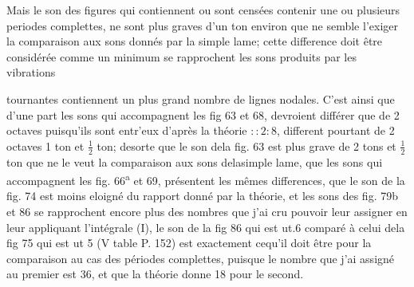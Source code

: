 \documentclass[11pt,a4paper]{article}
\begin{document}
Mais  le son des figures qui contiennent ou
sont censées contenir une ou plusieurs periodes complettes,
ne sont  plus graves d'un ton environ que ne semble l'exiger
la comparaison aux sons donnés par la simple lame;
 cette difference doit  être considérée comme un minimum
  se rapprochent  les sons produits par les vibrations


tournantes   contiennent
un plus grand nombre de lignes nodales. C'est ainsi que d'une part
les sons qui accompagnent les fig 63 et 68,   devroient
différer que de 2 octaves  puisqu'ils sont entr'eux
d'après la théorie $::2:8$,  different pourtant de 2 octaves
1 ton et $\frac{1}{2}$ ton; desorte que le son dela fig. 63 est
plus grave de 2 tons et $\frac{1}{2}$ ton que ne le veut la
comparaison aux sons delasimple lame,  que les sons
qui accompagnent les fig. 66\textsuperscript{a} et 69, présentent les mêmes
differences,   que  le son de la fig. 74  est
moins eloigné du rapport donné par la théorie, et 
les sons des fig. 79b et 86 se rapprochent encore plus des
nombres que j'ai cru pouvoir leur assigner en leur appliquant
l'intégrale (I),   le son de la fig 86
qui est ut.6 comparé à celui dela fig 75 qui est ut 5
(V table P. 152) est exactement cequ'il doit être pour la comparaison
au cas des périodes complettes, puisque le nombre que
j'ai assigné au premier est 36, et que la théorie donne
18 pour le second.
\end{document}

